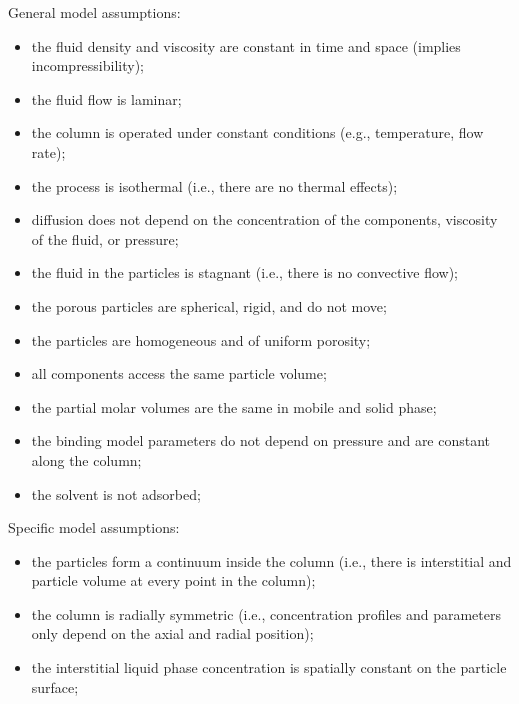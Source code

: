 \documentclass{article}
\begin{document}
General model assumptions:
\begin{itemize}
\item the fluid density and viscosity are constant in time and space (implies incompressibility);
\item the fluid flow is laminar;
\item the column is operated under constant conditions (e.g., temperature, flow rate);
\item the process is isothermal (i.e., there are no thermal effects);
\item diffusion does not depend on the concentration of the components, viscosity of the fluid, or pressure;
\item the fluid in the particles is stagnant (i.e., there is no convective flow);
\item the porous particles are spherical, rigid, and do not move;
\item the particles are homogeneous and of uniform porosity;
\item all components access the same particle volume;
\item the partial molar volumes are the same in mobile and solid phase;
\item the binding model parameters do not depend on pressure and are constant along the column;
\item the solvent is not adsorbed;
\end{itemize}


Specific model assumptions:
\begin{itemize}
\item the particles form a continuum inside the column (i.e., there is interstitial and particle volume at every point in the column);
\item the column is radially symmetric (i.e., concentration profiles and parameters only depend on the axial and radial position);
\item the interstitial liquid phase concentration is spatially constant on the particle surface;
\end{itemize}
\end{document}
